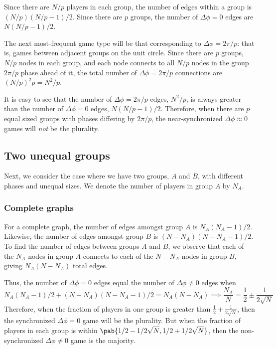 Since there are $N/p$ players in each group,
the number of edges within a group is $(N/p)(N/p - 1)/2$.
Since there are $p$ groups, the number of $\Delta \phi = 0$ edges are
$N (N/p - 1)/2$.

The next most-frequent game type will be that corresponding to
$\Delta \phi = 2 \pi/p$:
that is, games between adjacent groups on the unit circle.
Since there are $p$ groups,
$N/p$ nodes in each group,
and each node connects to all $N/p$ nodes in the group
$2 \pi/p$ phase ahead of it,
the total number of $\Delta \phi = 2 \pi/p$ connections
are $(N/p)^2 p = N^2/p$.

It is easy to see that the number of $\Delta \phi = 2\pi/p$ edges,
$N^2/p$,
is always greater than the number of $\Delta \phi = 0$ edges,
$N(N/p - 1)/2$.
Therefore, when there are $p$ equal sized groups
with phases differing by $2\pi/p$,
the near-synchronized $\Delta \phi \approx 0$ games will \emph{not} be the plurality.

\subsection{Two unequal groups}
Next, we consider the case where we have two groups, $A$ and $B$,
with different phases and unequal sizes.
We denote the number of players in group $A$ by $N_A$.

\subsubsection{Complete graphs}\label{sec:two_unequal_groups}
For a complete graph,
the number of edges amongst group $A$ is $N_A (N_A - 1)/2$.
Likewise, the number of edges amongst group $B$ is
$(N-N_A) (N - N_A - 1)/2$.
To find the number of edges between groups $A$ and $B$,
we observe that each of the $N_A$ nodes in group $A$
connects to each of the $N - N_A$ nodes in group $B$,
giving $N_A (N - N_A)$ total edges.

Thus, the number of $\Delta \phi = 0$ edges
equal the number of $\Delta \phi \neq 0$ edges when
\begin{equation*}
  N_A (N_A - 1)/2 + (N - N_A) (N - N_A - 1)/2 = N_A (N - N_A)
  \implies \frac{N_A}{N} = \frac{1}{2} \pm \frac{1}{2 \sqrt{N}}
\end{equation*}
Therefore, when the fraction of players in one group is greater than
$\frac{1}{2} + \frac{1}{2\sqrt{N}}$,
then the synchronized $\Delta \phi = 0$ game will be the plurality.
But when the fraction of players in each group is within
$\pab{1/2 - 1/2\sqrt{N}, 1/2 + 1/2\sqrt{N}}$,
then the non-synchronized $\Delta \phi \neq 0$ game is the majority.


